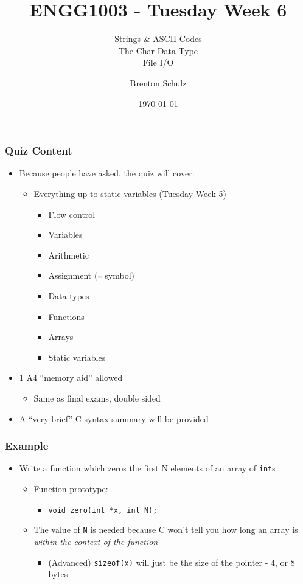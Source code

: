 \documentclass[14pt]{beamer}
\title{ENGG1003 - Tuesday Week 6}
\subtitle{Strings \& ASCII Codes\\The Char Data Type\\File I/O}
\author{Brenton Schulz}
\institute{University of Newcastle}
\date{\today}
\begin{document}
\titlepage

\begin{frame}
\frametitle{Quiz Content}
\begin{itemize}
\item Because people have asked, the quiz will cover:
\vspace{-4mm}
	\begin{itemize}
		\item Everything up to static variables (Tuesday Week 5)
		\vspace{-4mm}
			\begin{itemize}
				\item Flow control
				\item Variables
				\item Arithmetic
				\item Assignment (\texttt{=} symbol)
				\item Data types
				\item Functions
				\item Arrays
				\item Static variables
			\end{itemize}
	\end{itemize}
\item 1 A4 ``memory aid'' allowed
	\begin{itemize}
		\item Same as final exams, double sided
	\end{itemize}	
\item A ``very brief'' C syntax summary will be provided
\end{itemize}
\end{frame}

\begin{frame}
\frametitle{Example}
\begin{itemize}
\item Write a function which zeros the first N elements of an array of \texttt{int}s
\begin{itemize}
	\item Function prototype:
	\pause
		\begin{itemize}
			\item \texttt{void zero(int *x, int N);}
		\end{itemize}
	\pause
	\item The value of \texttt{N} is needed because C won't tell you how long an array is \textit{within the context of the function}
		\begin{itemize}
			\item (Advanced) \texttt{sizeof(x)} will just be the size of the pointer -  4, or 8 bytes
		\end{itemize}
	\end{itemize}
\end{itemize}
\end{frame}
\end{document}
